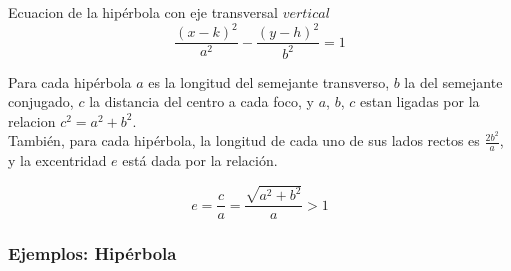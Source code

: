 \documentclass[12pt,a4paper,draft]{article}
\begin{document}
Ecuacion de la hipérbola con eje transversal $vertical$
$$ {\frac{(x - k)^2}{a^2} - \frac{(y - h)^2}{b^2} = 1} $$

Para cada hipérbola $a$ es la longitud del semejante transverso, $b$ la del semejante conjugado, $c$ la distancia del centro a cada foco, y $a$, $b$, $c$ estan ligadas por la relacion $c^2 = a^2 + b^2$.
\\También, para cada hipérbola, la longitud de cada uno de sus lados rectos es $\frac{2b^2}{a}$, y la excentridad $e$ está dada por la relación.

$$e = \frac{c}{a} = \frac{\sqrt{a^2 + b^2}}{a} > 1$$
\subsubsection{Ejemplos: Hipérbola}
\end{document}
